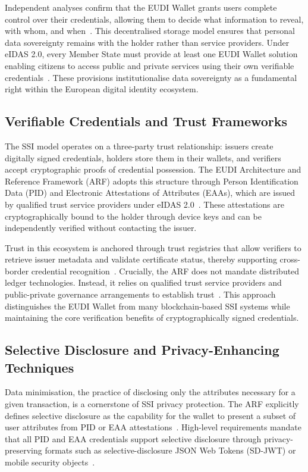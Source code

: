 \documentclass[sigconf,balance,nonacm,authordraft]{acmart}
\begin{document}
Independent analyses confirm that the EUDI Wallet grants users complete control over their credentials, allowing them to decide what information to reveal, with whom, and when~\cite{Gataca_ARF_SSI,ISC2_PrivacyDataSovereignty}. This decentralised storage model ensures that personal data sovereignty remains with the holder rather than service providers. Under eIDAS 2.0, every Member State must provide at least one EUDI Wallet solution enabling citizens to access public and private services using their own verifiable credentials~\cite{PortoThesis}. These provisions institutionalise data sovereignty as a fundamental right within the European digital identity ecosystem.

\subsection{Verifiable Credentials and Trust Frameworks}

The SSI model operates on a three-party trust relationship: issuers create digitally signed credentials, holders store them in their wallets, and verifiers accept cryptographic proofs of credential possession. The EUDI Architecture and Reference Framework (ARF) adopts this structure through Person Identification Data (PID) and Electronic Attestations of Attributes (EAAs), which are issued by qualified trust service providers under eIDAS 2.0~\cite{PortoThesis}. These attestations are cryptographically bound to the holder through device keys and can be independently verified without contacting the issuer.

Trust in this ecosystem is anchored through trust registries that allow verifiers to retrieve issuer metadata and validate certificate status, thereby supporting cross-border credential recognition~\cite{PortoThesis,Finextra_SSI_Components}. Crucially, the ARF does not mandate distributed ledger technologies. Instead, it relies on qualified trust service providers and public-private governance arrangements to establish trust~\cite{Finextra_SSI_Differences}. This approach distinguishes the EUDI Wallet from many blockchain-based SSI systems while maintaining the core verification benefits of cryptographically signed credentials.

\subsection{Selective Disclosure and Privacy-Enhancing Techniques}

Data minimisation, the practice of disclosing only the attributes necessary for a given transaction, is a cornerstone of SSI privacy protection. The ARF explicitly defines selective disclosure as the capability for the wallet to present a subset of user attributes from PID or EAA attestations~\cite{ARF_SelectDisclosureDefinition}. High-level requirements mandate that all PID and EAA credentials support selective disclosure through privacy-preserving formats such as selective-disclosure JSON Web Tokens (SD-JWT) or mobile security objects~\cite{ARF_AttestationSelectiveDisclosure}.
\end{document}
